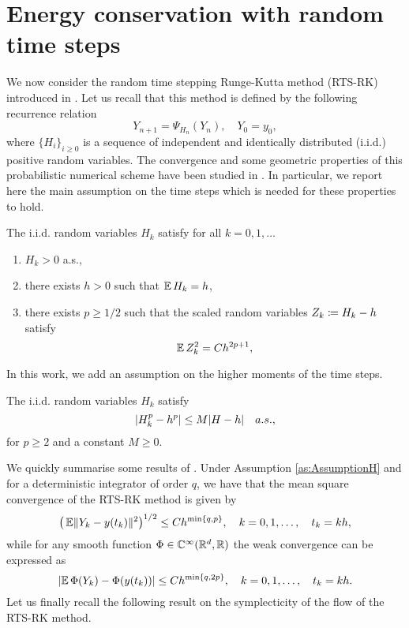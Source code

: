 \documentclass[10pt]{article}
\begin{document}
\section{Energy conservation with random time steps}\label{sec:RTSBEA} We now consider the random time stepping Runge-Kutta method (RTS-RK) introduced in \cite{AbG18}. Let us recall that this method is defined by the following recurrence relation
\begin{equation}\label{eq:RTSRK}
	Y_{n+1} = \Psi_{H_n}(Y_n), \quad Y_0 = y_0,
\end{equation}
where $\{H_i\}_{i\geq 0}$ is a sequence of independent and identically distributed (i.i.d.) positive random variables. The convergence and some geometric properties of this probabilistic numerical scheme have been studied in \cite{AbG18}. In particular, we report here the main assumption on the time steps which is needed for these properties to hold.
\begin{assumption}\label{as:AssumptionH} The i.i.d. random variables $H_k$ satisfy for all $k = 0, 1, \ldots$
	\begin{enumerate}
		\item\label{as:hStrong_Pos} $H_k > 0$ a.s.,
		\item\label{as:hStrong_E} there exists $h > 0$ such that $\operatorname{\mathbb{E}} H_k = h$,
		\item\label{as:hStrong_Var} there exists $p \geq 1/2$ such that the scaled random variables $Z_k \coloneqq H_k - h$ satisfy
		\begin{equation}
		\operatorname{\mathbb{E}} Z_k^2 = Ch^{2p+1},
		\end{equation}
	\end{enumerate}
\end{assumption}
In this work, we add an assumption on the higher moments of the time steps.
\begin{assumption}\label{as:AssumptionH2} The i.i.d. random variables $H_k$ satisfy
	\begin{equation}
		\lvert H_k^p - h^p\rvert \leq M\lvert H - h\rvert \quad a.s.,
	\end{equation}
	for $p \geq 2$ and a constant $M \geq 0$.
\end{assumption}	 
We quickly summarise some results of \cite{AbG18}. Under Assumption \ref{as:AssumptionH} and for a deterministic integrator of order $q$, we have that the mean square convergence of the RTS-RK method is given by
\begin{equation}
	\big(\operatorname{\mathbb{E}}\lVert Y_k - y(t_k)\rVert^2\big)^{1/2}	\leq Ch^{\min\{q, p\}}, \quad k = 0, 1, \ldots, \quad t_k = kh,
\end{equation} 
while for any smooth function $\Phi \in \mathbb{C}^{\infty}(\mathbb{R}^d, \mathbb{R})$ the weak convergence can be expressed as
\begin{equation}
	\lvert\operatorname{\mathbb{E}} \Phi(Y_k) - \Phi(y(t_k))\rvert \leq Ch^{\min\{q, 2p\}}, \quad k = 0, 1, \ldots, \quad t_k = kh.
\end{equation}
Let us finally recall the following result on the symplecticity of the flow of the RTS-RK method.
\end{document}
